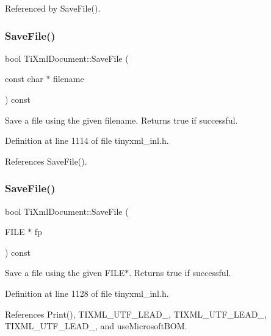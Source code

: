 Referenced by Save\+File().

\hypertarget{class_ti_xml_document_ae641f33784381017c44e107cc2c86b5c}{}\label{class_ti_xml_document_ae641f33784381017c44e107cc2c86b5c} 
\subsubsection{\texorpdfstring{Save\+File()}{SaveFile()}\hspace{0.1cm}{\footnotesize\ttfamily [2/4]}}
{\footnotesize\ttfamily bool Ti\+Xml\+Document\+::\+Save\+File (\begin{DoxyParamCaption}\item[{const char $\ast$}]{filename }\end{DoxyParamCaption}) const}



Save a file using the given filename. Returns true if successful. 



Definition at line 1114 of file tinyxml\+\_\+inl.\+h.



References Save\+File().

\hypertarget{class_ti_xml_document_a8f5a1022168a5767e32becec7b6f44ee}{}\label{class_ti_xml_document_a8f5a1022168a5767e32becec7b6f44ee} 
\subsubsection{\texorpdfstring{Save\+File()}{SaveFile()}\hspace{0.1cm}{\footnotesize\ttfamily [3/4]}}
{\footnotesize\ttfamily bool Ti\+Xml\+Document\+::\+Save\+File (\begin{DoxyParamCaption}\item[{F\+I\+LE $\ast$}]{fp }\end{DoxyParamCaption}) const}



Save a file using the given F\+I\+L\+E$\ast$. Returns true if successful. 



Definition at line 1128 of file tinyxml\+\_\+inl.\+h.



References Print(), T\+I\+X\+M\+L\+\_\+\+U\+T\+F\+\_\+\+L\+E\+A\+D\+\_, T\+I\+X\+M\+L\+\_\+\+U\+T\+F\+\_\+\+L\+E\+A\+D\+\_, T\+I\+X\+M\+L\+\_\+\+U\+T\+F\+\_\+\+L\+E\+A\+D\+\_, and use\+Microsoft\+B\+OM.

